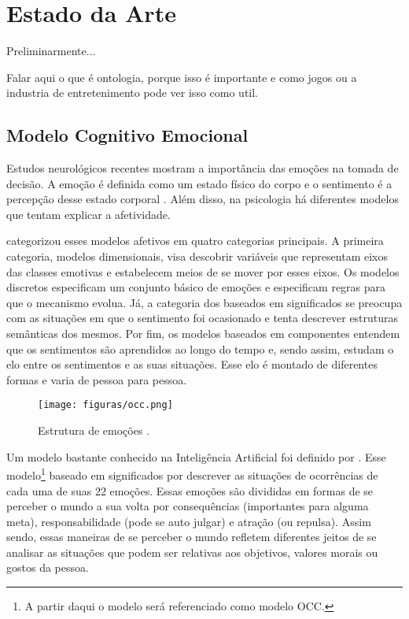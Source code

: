 \chapter{Estado da Arte} \label{cap:eda}

Preliminarmente... 

Falar aqui o que é ontologia, porque isso é importante e como jogos ou a
industria de entretenimento pode ver isso como util.

\section{Modelo Cognitivo Emocional} \label{cap:eda:mce}

Estudos neurológicos recentes \cite{ledoux1998emotional,damasio2004erro}
mostram a importância das emoções na tomada de decisão. A emoção é definida
como um estado físico do corpo e o sentimento é a percepção desse estado
corporal \cite{damasio2004erro}. Além disso, na psicologia há diferentes
modelos que tentam explicar a afetividade.

\citet{scherer2000tnoe} categorizou esses modelos afetivos em quatro
categorias principais. A primeira categoria, modelos dimensionais, visa
descobrir variáveis que representam eixos das classes emotivas e estabelecem
meios de se mover por esses eixos. Os modelos discretos especificam um
conjunto básico de emoções e especificam regras para que o mecanismo evolua.
Já, a categoria dos baseados em significados se preocupa com as situações
em que o sentimento foi ocasionado e tenta descrever estruturas semânticas dos
mesmos. Por fim, os modelos baseados em componentes entendem que os
sentimentos são aprendidos ao longo do tempo e, sendo assim, estudam o elo
entre os sentimentos e as suas situações. Esse elo é montado de diferentes
formas e varia de pessoa para pessoa.

\begin{figure}[t]
  \centering
    \texttt{[image: figuras/occ.png]}
  \caption{Estrutura de emoções \cite{ortony1988cse}.}
  \label{fig:occ_model}
\end{figure}

Um modelo bastante conhecido na Inteligência Artificial foi definido por
\citet{ortony1988cse}. Esse modelo\footnote{A partir daqui o modelo será
referenciado como modelo OCC.} baseado em
significados por descrever as situações de ocorrências de cada uma de suas 22
emoções.  Essas emoções são divididas em formas de se perceber o mundo a sua
volta por consequências (importantes para alguma meta), responsabilidade (pode
se auto julgar) e atração (ou repulsa). Assim sendo, essas maneiras de se
perceber o mundo refletem diferentes jeitos de se analisar as situações que
podem ser relativas aos objetivos, valores morais ou gostos da pessoa.

